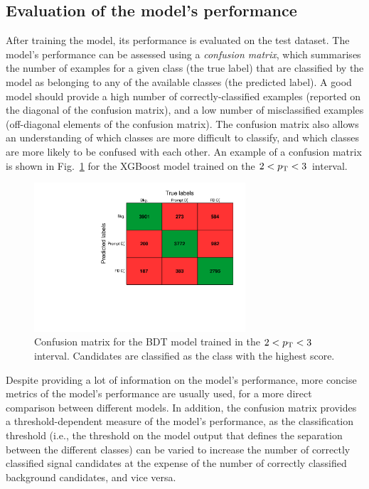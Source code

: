 \subsection{Evaluation of the model's performance}\label{sec:ml_performance}
After training the model, its performance is evaluated on the test dataset. The model's performance can be assessed using a \emph{confusion matrix}, which summarises the number of examples for a given class (the true label) that are classified by the model as belonging to any of the available classes (the predicted label). A good model should provide a high number of correctly-classified examples (reported on the diagonal of the confusion matrix), and a low number of misclassified examples (off-diagonal elements of the confusion matrix). The confusion matrix also allows an understanding of which classes are more difficult to classify, and which classes are more likely to be confused with each other. An example of a confusion matrix is shown in Fig.~\ref{fig:ml_confusion_matrix} for the XGBoost model trained on the $2<p_\mathrm{T}<3$~\gevc interval.

\begin{figure}
    \centering
    \includegraphics[width=0.7\textwidth]{Figures/Chapter 5/ConfusionMatrix.pdf}
    \caption{Confusion matrix for the BDT model trained in the \mbox{$2<p_\mathrm{T}<3$~\gevc} interval. Candidates are classified as the class with the highest score.}
    \label{fig:ml_confusion_matrix}
\end{figure}

Despite providing a lot of information on the model's performance, more concise metrics of the model's performance are usually used, for a more direct comparison between different models. In addition, the confusion matrix provides a threshold-dependent measure of the model's performance, as the classification threshold (i.e., the threshold on the model output that defines the separation between the different classes) can be varied to increase the number of correctly classified signal candidates at the expense of the number of correctly classified background candidates, and vice versa. 


